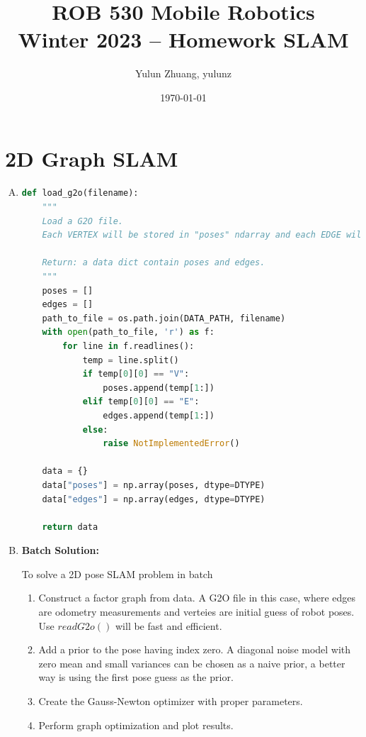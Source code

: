 \documentclass[11pt, oneside, letter]{article}
\begin{document}
\title{\huge\textbf{ROB 530 Mobile Robotics\\Winter 2023 -- Homework SLAM}}
\author{Yulun Zhuang, yulunz}
\date{\today}
\maketitle


\section{2D Graph SLAM}\label{sec:2d}
\begin{enumerate}[A.]
\item 
\begin{lstlisting}[language=Python]
def load_g2o(filename):
    """
    Load a G2O file. 
    Each VERTEX will be stored in "poses" ndarray and each EDGE will be stored in "edges" ndarray.

    Return: a data dict contain poses and edges.
    """
    poses = []
    edges = []
    path_to_file = os.path.join(DATA_PATH, filename)
    with open(path_to_file, 'r') as f:
        for line in f.readlines():
            temp = line.split()
            if temp[0][0] == "V":
                poses.append(temp[1:])
            elif temp[0][0] == "E":
                edges.append(temp[1:])
            else:
                raise NotImplementedError()
                
    data = {}
    data["poses"] = np.array(poses, dtype=DTYPE)
    data["edges"] = np.array(edges, dtype=DTYPE)
    
    return data
\end{lstlisting}

\item \textbf{Batch Solution:}

To solve a 2D pose SLAM problem in batch
\begin{enumerate}[1.]
    \item Construct a factor graph from data. A G2O file in this case, where edges are odometry measurements and verteies are initial guess of robot poses. Use $readG2o()$ will be fast and efficient.
    \item Add a prior to the pose having index zero. A diagonal noise model with zero mean and small variances can be chosen as a naive prior, a better way is using the first pose guess as the prior.
    \item Create the Gauss-Newton optimizer with proper parameters.
    \item Perform graph optimization and plot results.
\end{enumerate}


\end{enumerate}
\end{document}
